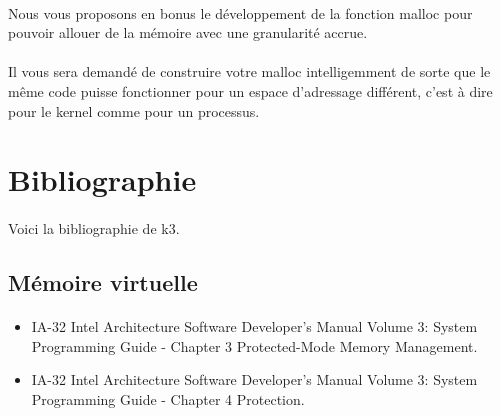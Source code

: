 \documentclass[10pt,a4wide]{article}
\begin{document}
\paragraph{}

Nous vous proposons en bonus le d\'eveloppement de la fonction malloc
pour pouvoir allouer de la m\'emoire avec une granularit\'e accrue.

\paragraph{}

Il vous sera demand\'e de construire votre malloc intelligemment de sorte
que le m\^eme code puisse fonctionner pour un espace d'adressage diff\'erent,
c'est \`a dire pour le kernel comme pour un processus.

\section{Bibliographie}

\paragraph{}

Voici la bibliographie de k3.

\subsection{M\'emoire virtuelle}

\paragraph{}

\begin{itemize}
\item IA-32 Intel Architecture Software Developer's Manual Volume 3:
      System Programming Guide - Chapter 3 Protected-Mode Memory Management.
\item IA-32 Intel Architecture Software Developer's Manual Volume 3:
      System Programming Guide - Chapter 4 Protection.
\end{itemize}
\end{document}
